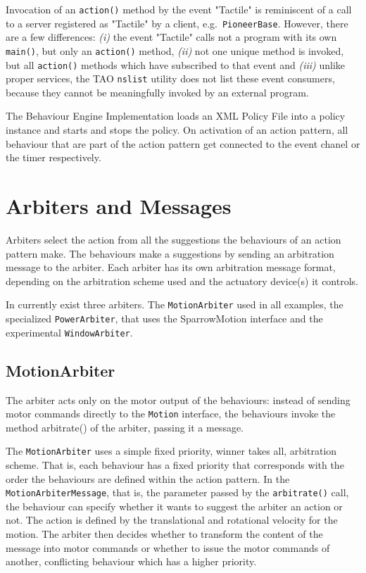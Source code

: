 Invocation of an {\tt action()} method by the event "Tactile"
is reminiscent of a call to a server registered as "Tactile" by a client,
e.g.\ {\tt PioneerBase}. However, there are a few differences:
{\sl (i)} the event "Tactile" calls not a program with its own
{\tt main()}, but only an {\tt action()} method,
{\sl (ii)} not one unique method is invoked,
but all {\tt action()} methods which have subscribed to that event and
{\sl (iii)} unlike proper services, the TAO {\tt nslist} utility does
not list these event consumers,
because they cannot be meaningfully invoked by an external program.


The Behaviour Engine Implementation loads an XML Policy File into a
policy instance and starts and stops the policy. On activation of an
action pattern, all behaviour that are part of the action pattern get
connected to the event chanel or the timer respectively.

\section{Arbiters and Messages}

Arbiters select the action from all the suggestions the behaviours of
an action pattern make. The behaviours make a suggestions by sending
an arbitration message to the arbiter. Each arbiter has its own
arbitration message format, depending on the arbitration scheme used
and the actuatory device(s) it controls.

In \miro currently exist three arbiters. The {\tt MotionArbiter} used
in all examples, the specialized {\tt PowerArbiter}, that uses the
SparrowMotion interface and the experimental {\tt WindowArbiter}.

\subsection{MotionArbiter}

The arbiter acts only on the motor output of the behaviours:
instead of sending motor commands directly to the {\tt Motion} interface,
the behaviours invoke the method arbitrate() of the arbiter,
passing it a message.

The {\tt MotionArbiter} uses a simple fixed priority, winner
takes all, arbitration scheme. That is, each behaviour has a fixed
priority that corresponds with the order the behaviours are defined
within the action pattern. In the {\tt MotionArbiterMessage}, that is,
the parameter passed by the {\tt arbitrate()} call, the behaviour can
specify whether it wants to suggest the arbiter an action or not. The
action is defined by the translational and rotational velocity for the
motion. The arbiter then decides whether to transform the content of
the message into motor commands or whether to issue the motor commands
of another, conflicting behaviour which has a higher priority.

